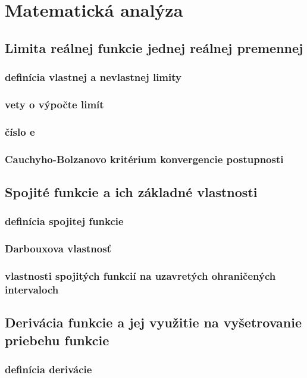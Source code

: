 \chapter[Matematická analýza]{Matematická analýza}
\label{matematicka_analyza} %

\section{Limita reálnej funkcie jednej reálnej premennej}
\subsection{definícia vlastnej a nevlastnej limity}
\subsection{vety o výpočte limít}
\subsection{číslo e}
\subsection{Cauchyho-Bolzanovo kritérium konvergencie postupnosti}


\section{Spojité funkcie a ich základné vlastnosti}
\subsection{definícia spojitej funkcie}
\subsection{Darbouxova vlastnosť}
\subsection{vlastnosti spojitých funkcií na uzavretých ohraničených intervaloch}

\section{Derivácia funkcie a jej využitie na vyšetrovanie priebehu funkcie}
\subsection{definícia derivácie}
